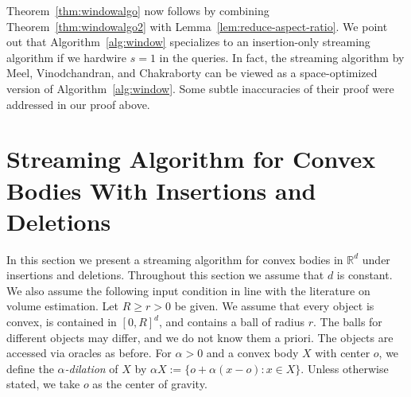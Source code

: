 \documentclass[11pt]{article}
\def\Real{\mathbb{R}}
\let\R\Real
\begin{document}
%
Theorem~\ref{thm:windowalgo} now follows by combining Theorem~\ref{thm:windowalgo2} with Lemma~\ref{lem:reduce-aspect-ratio}.
%
We point out that Algorithm~\ref{alg:window} specializes to an insertion-only streaming algorithm if we hardwire $s = 1$ in the queries. In fact, the streaming algorithm by Meel, Vinodchandran, and Chakraborty \cite{MVC21} can be viewed as a space-optimized version of Algorithm~\ref{alg:window}. Some subtle inaccuracies of their proof were addressed in our proof above.
%
%
\section{Streaming Algorithm for Convex Bodies With Insertions and Deletions}
\label{sec:convex}
In this section we present a streaming algorithm for convex bodies in $\R^d$ under insertions and deletions. Throughout this section we assume that $d$ is constant. We also assume the following input condition in line with the literature on volume estimation. Let $R \geq r > 0$ be given. We assume that every object is convex, is contained in $[0,R]^d$, and contains a ball of radius $r$. The balls for different objects may differ, and we do not know them a priori. The objects are accessed via oracles as before.
%
For $\alpha > 0$ and a convex body $X$ with center $o$, we define the \emph{$\alpha$-dilation} of $X$ by $\alpha X := \{ o + \alpha (x-o) : x \in X \}$. Unless otherwise stated, we take $o$ as the center of gravity.
%
\end{document}
